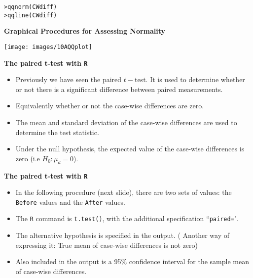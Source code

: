 \documentclass[]{report}
\begin{document}
\begin{verbatim}
>qqnorm(CWdiff)
>qqline(CWdiff)
\end{verbatim}





\textbf{Graphical Procedures for Assessing Normality}

\begin{center}
	\texttt{[image: images/10AQQplot]}
\end{center}






\textbf{The paired t-test with \texttt{R}}
\vspace{-1cm}
\begin{itemize}
	\item Previously we have seen the paired $t-$test. It is used to determine whether or
	not there is a significant difference between paired measurements. \item Equivalently whether or not
	the case-wise differences are zero.
	\item The mean and standard deviation of the case-wise differences are used to determine the test statistic.
	\item Under the null hypothesis, the expected value of the case-wise differences is zero (i.e $H_0 : \mu_d = 0$).
\end{itemize}







\textbf{The paired t-test with \texttt{R}}

\begin{itemize}
	\item In the following procedure (next slide), there are two sets of values: the \texttt{Before} values and the \texttt{After} values.
	\item The \texttt{R} command is \texttt{t.test()}, with the additional specification ``\texttt{paired=}".
	\item The alternative hypothesis is specified in the output. ( Another way of expressing it: True mean of case-wise differences is not zero)
	\item Also included in the output is a 95\% confidence interval for the sample mean of case-wise differences.
\end{itemize}
\end{document}
